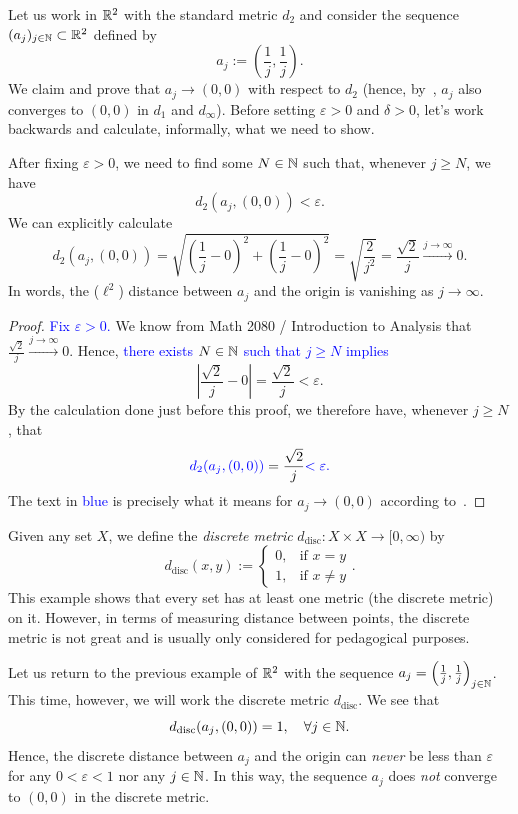 \begin{eg}
	\label{eg_diag_vanish}
	Let us work in $\mathbb{R}^2$ with the standard metric $d_2$ and consider the sequence $(a_j)_{j\in\mathbb{N}}\subset \mathbb{R}^2$ defined by
	\[
	a_j := \left(\frac{1}{j},\frac{1}{j}\right).
	\]
	We claim and prove that $a_j\to (0,0)$ with respect to $d_2$ (hence, by~, $a_j$ also converges to $(0,0)$ in $d_1$ and $d_\infty$). Before setting $\varepsilon>0$ and $\delta>0$, let's work backwards and calculate, informally, what we need to show.
	
	After fixing $\varepsilon>0$, we need to find some $N\in\mathbb{N}$ such that, whenever $j\ge N$, we have
	\[
	d_2(a_j,(0,0))<\varepsilon.
	\]
	We can explicitly calculate
	\[
	d_2(a_j,(0,0)) = \sqrt{\left(\frac{1}{j} - 0\right)^2 + \left(\frac{1}{j} - 0\right)^2} = \sqrt{\frac{2}{j^2}} = \frac{\sqrt{2}}{j}\overset{j\to \infty}{\to}0.
	\]
	In words, the ($\ell^2$) distance between $a_j$ and the origin is vanishing as $j\to \infty$.
	\begin{proof}
		\textcolor{blue}{Fix $\varepsilon>0$.} We know from Math 2080 / Introduction to Analysis that $\frac{\sqrt{2}}{j}\overset{j\to \infty}{\to} 0$. Hence, \textcolor{blue}{there exists $N\in\mathbb{N}$ such that $j\ge N$ implies}
		\[
		\left|\frac{\sqrt{2}}{j} - 0\right| = \frac{\sqrt{2}}{j} < \varepsilon.
		\]
		By the calculation done just before this proof, we therefore have, whenever $j\ge N$, that
		\[
		{\color{blue}d_2(a_j,(0,0))} = \frac{\sqrt{2}}{j} {\color{blue}<\varepsilon.}
		\]
		The text in \textcolor{blue}{blue} is precisely what it means for $a_j\to (0,0)$ according to~.
	\end{proof}
\end{eg}
\begin{eg}
\label{eg:disc_metric}
Given any set $X$, we define the \textit{discrete metric} $d_\text{disc}:X\times X \to [0,\infty)$ by
\[
d_\text{disc}(x,y) := \left\{
\begin{array}{cl}
	0, 	&\text{if }x=y 	\\
	1, 	&\text{if }x\neq y
\end{array}
\right..
\]
This example shows that every set has at least one metric (the discrete metric) on it. However, in terms of measuring distance between points, the discrete metric is not great and is usually only considered for pedagogical purposes.

Let us return to the previous example of $\mathbb{R}^2$ with the sequence $a_j = \left(\frac{1}{j},\frac{1}{j}\right)_{j\in\mathbb{N}}$. This time, however, we will work the discrete metric $d_\text{disc}$. We see that
\[
d_\text{disc}(a_j,(0,0)) = 1,\quad \forall j\in\mathbb{N}.
\]
Hence, the discrete distance between $a_j$ and the origin can \textit{never} be less than $\varepsilon$ for any $0<\varepsilon<1$ nor any $j\in\mathbb{N}$. In this way, the sequence $a_j$ does \textit{not} converge to $(0,0)$ in the discrete metric.
\end{eg}
